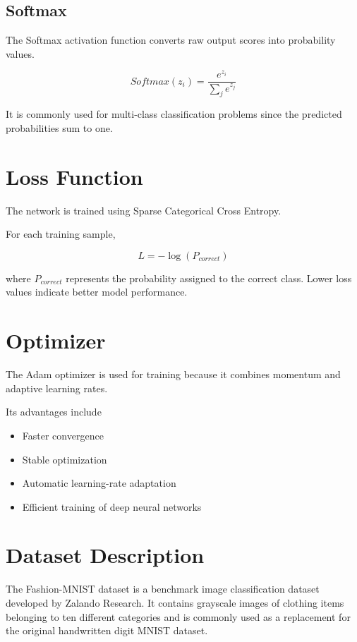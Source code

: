 \documentclass[12pt,a4paper]{article}
\begin{document}
\subsection{Softmax}

The Softmax activation function converts raw output scores into probability values.

\[
Softmax(z_i)=
\frac{e^{z_i}}
{\sum_j e^{z_j}}
\]

It is commonly used for multi-class classification problems since the predicted probabilities sum to one.

\section{Loss Function}

The network is trained using Sparse Categorical Cross Entropy.

For each training sample,

\[
L=-\log(P_{correct})
\]

where $P_{correct}$ represents the probability assigned to the correct class. Lower loss values indicate better model performance.

\section{Optimizer}

The Adam optimizer is used for training because it combines momentum and adaptive learning rates.

Its advantages include

\begin{itemize}
\item Faster convergence
\item Stable optimization
\item Automatic learning-rate adaptation
\item Efficient training of deep neural networks
\end{itemize}

\section{Dataset Description}

The Fashion-MNIST dataset is a benchmark image classification dataset developed by Zalando Research. It contains grayscale images of clothing items belonging to ten different categories and is commonly used as a replacement for the original handwritten digit MNIST dataset.
\end{document}

